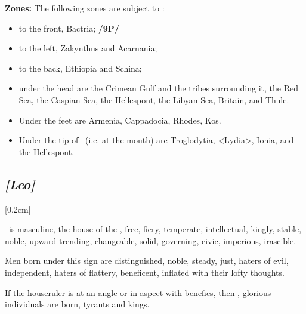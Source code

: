 \textbf{Zones:} The following zones are subject to \Cancer: 
\begin{itemize}
\item to the front, Bactria; \textbf{/9P/}
\item to the left, Zakynthus and Acarnania; 
\item to the back, Ethiopia and Schina;
\item under the head are the Crimean Gulf and the tribes surrounding it, the Red Sea, the Caspian Sea, the Hellespont, the Libyan Sea, Britain, and Thule. 
\item Under the feet are Armenia, Cappadocia, Rhodes, Kos. \item Under the tip of \Cancer\, (i.e. at the mouth) are Troglodytia, <Lydia>, Ionia, and the Hellespont.
\end{itemize}

\secbr
\subsection{\textit{[Leo]}}
[0.2cm]

 \Leo\, is masculine, the house of the \Sun, free,  fiery, temperate, intellectual, kingly, stable, noble, upward-trending, changeable,  solid, governing, civic, imperious, irascible.

Men born under this sign are distinguished, noble, steady, just, haters of evil, independent, haters of flattery, beneficent, inflated with their lofty thoughts. 

\mndl[0.2cm]
If the houseruler is at an angle or in aspect with benefics, then , glorious individuals are born, tyrants and kings.

